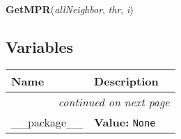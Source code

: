     \label{olsr:GetMPR}

    \vspace{0.5ex}

\hspace{.8\funcindent}\begin{boxedminipage}{\funcwidth}

    \raggedright \textbf{GetMPR}(\textit{allNeighbor}, \textit{thr}, \textit{i})

\setlength{\parskip}{2ex}
\setlength{\parskip}{1ex}
    \end{boxedminipage}



  \subsection{Variables}

    \vspace{-1cm}
\hspace{\varindent}\begin{longtable}{|p{\varnamewidth}|p{\vardescrwidth}|l}
\cline{1-2}
\cline{1-2} \centering \textbf{Name} & \centering \textbf{Description}& \\
\cline{1-2}
\endhead\cline{1-2}\multicolumn{3}{r}{\small\textit{continued on next page}}\\\endfoot\cline{1-2}
\endlastfoot\raggedright \_\-\_\-p\-a\-c\-k\-a\-g\-e\-\_\-\_\- & \raggedright \textbf{Value:} 
{\tt None}&\\
\cline{1-2}
\end{longtable}


